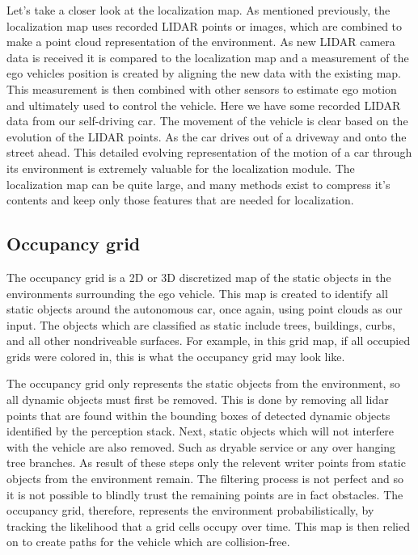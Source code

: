 Let's take a closer look
at the localization map. As mentioned previously, the localization map uses
recorded LIDAR points or images, which are combined to make a point
cloud representation of the environment. As new LIDAR camera data is received it
is compared to the localization map and a measurement of the ego vehicles
position is created by aligning the new data with the existing map. This measurement is then combined with
other sensors to estimate ego motion and ultimately used to control the vehicle. Here we have some recorded LIDAR
data from our self-driving car. The movement of the vehicle is clear based
on the evolution of the LIDAR points. As the car drives out of a driveway and
onto the street ahead. This detailed evolving representation
of the motion of a car through its environment is extremely valuable for
the localization module. The localization map can be quite large,
and many methods exist to compress it's contents and keep only those features
that are needed for localization.


\subsection{Occupancy grid}

The occupancy grid is a 2D or 3D discretized map of the static objects in the environments surrounding
the ego vehicle. This map is created to identify all static objects around the autonomous car, once again,
using point clouds as our input. The objects which are classified as
static include trees, buildings, curbs, and
all other nondriveable surfaces. For example, in this grid map,
if all occupied grids were colored in, this is what the occupancy
grid may look like. 


The occupancy grid only represents
the static objects from the environment, so all dynamic objects must first be removed. This is done by removing all lidar points
that are found within the bounding boxes of detected dynamic objects
identified by the perception stack. Next, static objects
which will not interfere with the vehicle are also removed. Such as dryable service or
any over hanging tree branches. As result of these steps only the relevent
writer points from static objects from the environment remain. The filtering process is not perfect and
so it is not possible to blindly trust the remaining points are in fact obstacles.
The occupancy grid, therefore, represents the environment probabilistically, by tracking the likelihood that
a grid cells occupy over time. This map is then relied on to create paths
for the vehicle which are collision-free. 

